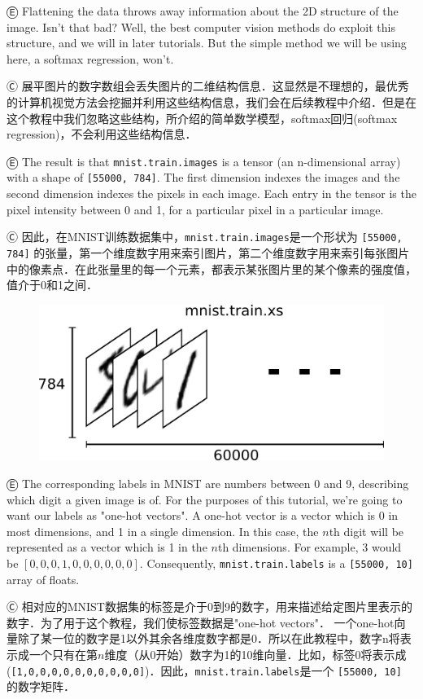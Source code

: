 Ⓔ \textcolor{etc}{Flattening the data throws away information about the 2D structure of the image. Isn't that bad? Well, the best computer vision methods do exploit this structure, and we will in later tutorials. But the simple method we will be using here, a softmax regression, won't.}

Ⓒ 展平图片的数字数组会丢失图片的二维结构信息．这显然是不理想的，最优秀的计算机视觉方法会挖掘并利用这些结构信息，我们会在后续教程中介绍．但是在这个教程中我们忽略这些结构，所介绍的简单数学模型，softmax回归(softmax regression)，不会利用这些结构信息．

Ⓔ \textcolor{etc}{The result is that \lstinline{mnist.train.images} is a tensor (an n-dimensional array) with a shape of \lstinline{[55000, 784]}. The first dimension indexes the images and the second dimension indexes the pixels in each image. Each entry in the tensor is the pixel intensity between 0 and 1, for a particular pixel in a particular image.}

Ⓒ 因此，在MNIST训练数据集中，\lstinline{mnist.train.images}是一个形状为 \lstinline{[55000, 784]} 的张量，第一个维度数字用来索引图片，第二个维度数字用来索引每张图片中的像素点．在此张量里的每一个元素，都表示某张图片里的某个像素的强度值，值介于0和1之间．

\begin{figure}[htbp]
\centering
\includegraphics[width=.65\textwidth]{../SOURCE/images/mnist-train-xs.png}
\caption{}
\end{figure}

Ⓔ \textcolor{etc}{The corresponding labels in MNIST are numbers between 0 and 9, describing which digit a given image is of. For the purposes of this tutorial, we're going to want our labels as "one-hot vectors". A one-hot vector is a vector which is 0 in most dimensions, and 1 in a single dimension. In this case, the $n$th digit will be represented as a vector which is 1 in the $n$th dimensions. For example, 3 would be $[0,0,0,1,0,0,0,0,0,0]$. Consequently, \lstinline{mnist.train.labels} is a \lstinline{[55000, 10]} array of floats.}

Ⓒ 相对应的MNIST数据集的标签是介于0到9的数字，用来描述给定图片里表示的数字．为了用于这个教程，我们使标签数据是"one-hot vectors"． 一个one-hot向量除了某一位的数字是1以外其余各维度数字都是0．所以在此教程中，数字n将表示成一个只有在第$n$维度（从0开始）数字为1的10维向量．比如，标签0将表示成(\lstinline{[1,0,0,0,0,0,0,0,0,0,0]})．因此，\lstinline{mnist.train.labels}是一个 \lstinline{[55000, 10]} 的数字矩阵．

